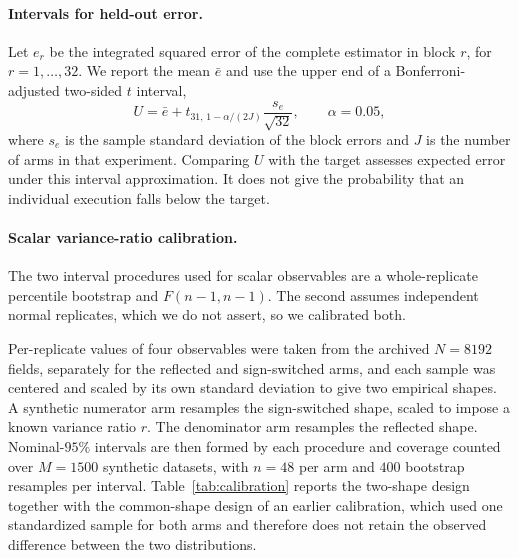 \documentclass[smallextended,nospthms]{svjour3}
\theoremstyle{plain}
\theoremstyle{definition}
\theoremstyle{remark}
\numberwithin{equation}{section}
\begin{document}
\paragraph{Intervals for held-out error.}
Let $e_r$ be the integrated squared error of the complete estimator in block
$r$, for $r=1,\ldots,32$. We report the mean $\bar e$ and use the upper end
of a Bonferroni-adjusted two-sided $t$ interval,
\[
 U=\bar e+t_{31,\,1-\alpha/(2J)}\frac{s_e}{\sqrt{32}},
 \qquad \alpha=0.05,
\]
where $s_e$ is the sample standard deviation of the block errors and $J$
is the number of arms in that experiment. Comparing $U$ with the target
assesses expected error under this interval approximation. It does not
give the probability that an individual execution falls below the target.

\paragraph{Scalar variance-ratio calibration.}
The two interval procedures used for scalar observables are a whole-replicate
percentile bootstrap and $F(n-1,n-1)$. The second assumes independent normal
replicates, which we do not assert, so we calibrated both.

Per-replicate values of four observables were taken from the archived $N=8192$
fields, separately for the reflected and sign-switched arms, and each
sample was centered and scaled by its own standard deviation to give two
empirical shapes. A synthetic numerator arm resamples the sign-switched shape,
scaled to impose a known variance ratio $r$. The denominator arm resamples the
reflected shape. Nominal-$95\%$ intervals are then formed by each procedure and
coverage counted over $M=1500$ synthetic datasets, with $n=48$ per arm and $400$
bootstrap resamples per interval. Table~\ref{tab:calibration} reports the
two-shape design together with the common-shape design of an earlier
calibration, which used one standardized sample for both arms and therefore
does not retain the observed difference between the two distributions.
\end{document}
